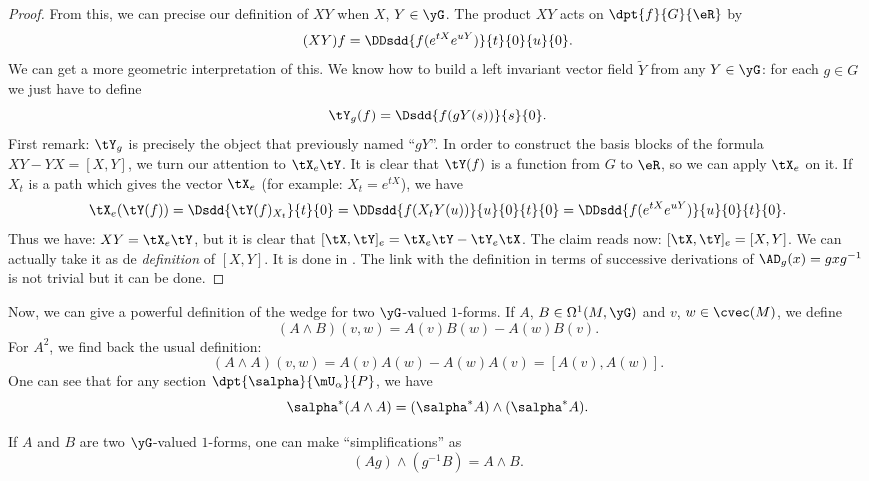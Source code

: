 \begin{proof}
	From this, we can precise our definition of $XY$ when $X$, $Y\in\yG$. The product $XY$ acts on $\dpt{f}{G}{\eR}$ by
	\[
		(XY)f=\DDsdd{f(e^{tX}e^{uY})}{t}{0}{u}{0}.
	\]
	We can get a more geometric interpretation of this. We know how to build a left invariant vector field $\tilde Y$ from any $Y\in\yG$: for each $g\in G$ we just have to define
	\[
		\tY_g(f)=\Dsdd{f(gY(s))}{s}{0}.
	\]
	First remark: $\tY_g$ is precisely the object that previously named ``$gY$''. In order to construct the basis blocks of the formula $XY-YX=[X,Y]$, we turn our attention to $\tX_e\tY$. It is clear that $\tY(f)$ is a function from $G$ to $\eR$, so we can apply $\tX_e$ on it. If $X_t$ is a path which gives the vector $\tX_e$ (for example: $X_t=e^{tX}$), we have
	\begin{equation}
		\tX_e(\tY(f))=\Dsdd{\tY(f)_{X_t}}{t}{0}\\
		=\DDsdd{f(X_tY(u))}{u}{0}{t}{0}\\
		=\DDsdd{f(e^{tX}e^{uY})}{u}{0}{t}{0}.
	\end{equation}
	Thus we have: $XY=\tX_e\tY$, but it is clear that $[\tX,\tY]_e=\tX_e\tY-\tY_e\tX$. The claim reads now: $[\tX,\tY]_e=[X,Y]$. We can actually take it as de \emph{definition} of $[X,Y]$. It is done in \cite{Helgason}. The link with the definition in terms of successive derivations of $\AD_g(x)=gxg^{-1}$ is not trivial but it can be done.
\end{proof}



Now, we can give a powerful definition of the wedge for two $\yG$-valued $1$-forms. If $A$, $B\in\Omega^1(M,\yG)$ and $v$, $w\in\cvec(M)$, we define
\begin{equation}
	(A\wedge B)(v,w)=A(v)B(w)-A(w)B(v).
\end{equation}
For $A^2$, we find back the usual definition:
\[
	(A\wedge A)(v,w)=A(v)A(w)-A(w)A(v)=[A(v),A(w)].
\]
%
One can see that for any section $\dpt{\salpha}{\mU_{\alpha}}{P}$, we have
\begin{equation}\label{eq:1907r2}
	\salpha^*(A\wedge A)=(\salpha^*A)\wedge(\salpha^*A).
\end{equation}


\begin{lemma}
	If $A$ and $B$ are two $\yG$-valued $1$-forms, one can make  ``simplifications'' as
	\begin{equation}
		(Ag)\wedge(g^{-1} B)=A\wedge B.
	\end{equation}
	\label{lem:simplif}
\end{lemma}


